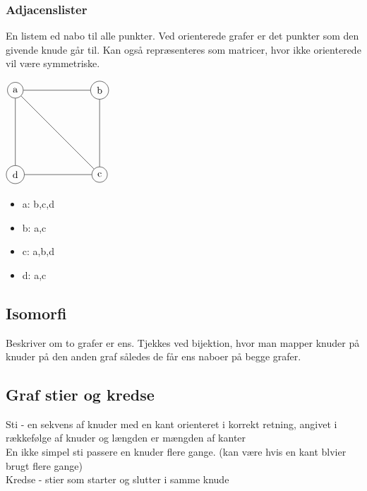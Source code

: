 \documentclass[12pt, a4paper]{article}
\begin{document}
		\subsubsection{Adjacenslister}
			En listem ed nabo til alle punkter. Ved orienterede grafer er det punkter som den givende knude går til. Kan også repræsenteres som matricer, hvor ikke orienterede vil være symmetriske.\\
			\begin{minipage}{0.45\textwidth}
				$\begin{tikzpicture}[scale=3]
						\tikzstyle{vertex}=[circle,draw=black]
						\node[vertex](v1) at (0,0){d};
						\node[vertex](v2) at (1,0){c};
						\node[vertex](v4) at (0,1) {a};
						\node[vertex](v3) at (1,1) {b};
						\path[-]
							(v1) edge node {}(v2)
							(v2) edge node {}(v3)
							(v4) edge node {}(v1)
							(v3) edge node {}(v4)
							(v2) edge node {}(v4);
					\end{tikzpicture}$\\
			\end{minipage}
			\hfill
			\begin{minipage}{0.45\textwidth}
				\begin{itemize}
					\item a: b,c,d
					\item b: a,c
					\item c: a,b,d
					\item d: a,c
				\end{itemize}
			\end{minipage}	
	\subsection{Isomorfi}
		Beskriver om to grafer er ens. Tjekkes ved bijektion, hvor man mapper knuder på knuder på den anden graf således de får ens naboer på begge grafer.
	
	\subsection{Graf stier og kredse}
		Sti - en sekvens af knuder med en kant orienteret i korrekt retning, angivet i rækkefølge af knuder og længden er mængden af kanter\\
		En ikke simpel sti passere en knuder flere gange. (kan være hvis en kant blvier brugt flere gange)\\
		Kredse - stier som starter og slutter i samme knude\\
\end{document}
